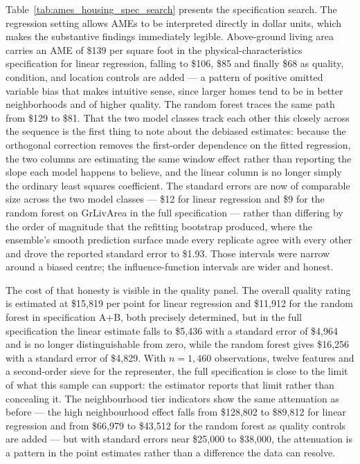 \documentclass[12pt,a4paper]{article}
\numberwithin{equation}{section}
\theoremstyle{plain}
\theoremstyle{definition}
\begin{document}
	Table~\ref{tab:ames_housing_spec_search} presents the specification search. The regression setting allows AMEs to be interpreted directly in dollar units, which makes the substantive findings immediately legible. Above-ground living area carries an AME of \$139 per square foot in the physical-characteristics specification for linear regression, falling to \$106, \$85 and finally \$68 as quality, condition, and location controls are added --- a pattern of positive omitted variable bias that makes intuitive sense, since larger homes tend to be in better neighborhoods and of higher quality. The random forest traces the same path from \$129 to \$81. That the two model classes track each other this closely across the sequence is the first thing to note about the debiased estimates: because the orthogonal correction removes the first-order dependence on the fitted regression, the two columns are estimating the same window effect rather than reporting the slope each model happens to believe, and the linear column is no longer simply the ordinary least squares coefficient. The standard errors are now of comparable size across the two model classes --- \$12 for linear regression and \$9 for the random forest on GrLivArea in the full specification --- rather than differing by the order of magnitude that the refitting bootstrap produced, where the ensemble's smooth prediction surface made every replicate agree with every other and drove the reported standard error to \$1.93. Those intervals were narrow around a biased centre; the influence-function intervals are wider and honest.

	The cost of that honesty is visible in the quality panel. The overall quality rating is estimated at \$15,819 per point for linear regression and \$11,912 for the random forest in specification A+B, both precisely determined, but in the full specification the linear estimate falls to \$5,436 with a standard error of \$4,964 and is no longer distinguishable from zero, while the random forest gives \$16,256 with a standard error of \$4,829. With $n = 1{,}460$ observations, twelve features and a second-order sieve for the representer, the full specification is close to the limit of what this sample can support: the estimator reports that limit rather than concealing it. The neighbourhood tier indicators show the same attenuation as before --- the high neighbourhood effect falls from \$128,802 to \$89,812 for linear regression and from \$66,979 to \$43,512 for the random forest as quality controls are added --- but with standard errors near \$25{,}000 to \$38{,}000, the attenuation is a pattern in the point estimates rather than a difference the data can resolve.
	
\end{document}

